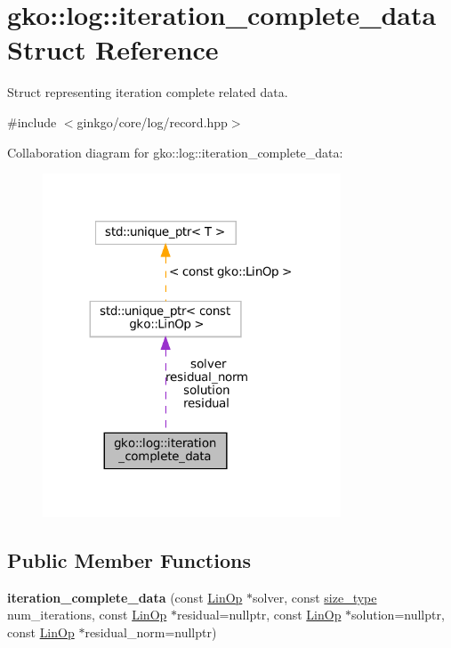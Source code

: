\hypertarget{structgko_1_1log_1_1iteration__complete__data}{}\section{gko\+:\+:log\+:\+:iteration\+\_\+complete\+\_\+data Struct Reference}
\label{structgko_1_1log_1_1iteration__complete__data}


Struct representing iteration complete related data.  




{\ttfamily \#include $<$ginkgo/core/log/record.\+hpp$>$}



Collaboration diagram for gko\+:\+:log\+:\+:iteration\+\_\+complete\+\_\+data\+:
\nopagebreak
\begin{figure}[H]
\begin{center}
\leavevmode
\includegraphics[width=251pt]{structgko_1_1log_1_1iteration__complete__data__coll__graph}
\end{center}
\end{figure}
\subsection*{Public Member Functions}
\begin{DoxyCompactItemize}
\item 
\mbox{\label{structgko_1_1log_1_1iteration__complete__data_a249603818590d46cdd18777089eaeec9}} 
{\bfseries iteration\+\_\+complete\+\_\+data} (const \hyperlink{classgko_1_1LinOp}{Lin\+Op} $\ast$solver, const \hyperlink{namespacegko_a6e5c95df0ae4e47aab2f604a22d98ee7}{size\+\_\+type} num\+\_\+iterations, const \hyperlink{classgko_1_1LinOp}{Lin\+Op} $\ast$residual=nullptr, const \hyperlink{classgko_1_1LinOp}{Lin\+Op} $\ast$solution=nullptr, const \hyperlink{classgko_1_1LinOp}{Lin\+Op} $\ast$residual\+\_\+norm=nullptr)
\end{DoxyCompactItemize}

